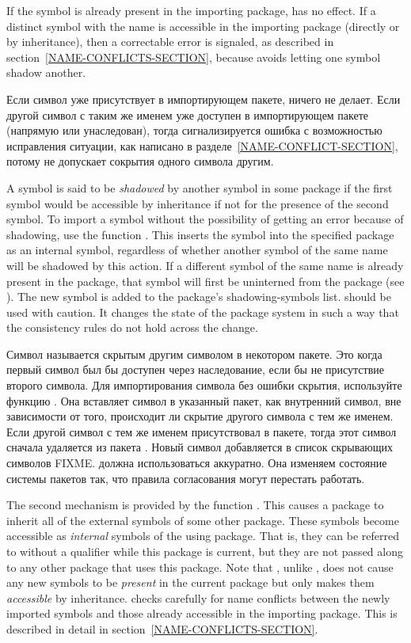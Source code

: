 If the symbol is already present in the importing package, 
has no effect.  If a distinct symbol with the name  is
accessible in the importing package (directly or by inheritance), then a
correctable error is signaled, as described in
section~\ref{NAME-CONFLICTS-SECTION}, because  avoids letting
one symbol shadow another.

Если символ уже присутствует в импортирующем пакете,  ничего не
делает. Если другой символ с таким же именем  уже доступен в
импортирующем пакете (напрямую или унаследован), тогда сигнализируется ошибка с
возможностью исправления ситуации, как написано в
разделе~\ref{NAME-CONFLICT-SECTION}, потому  не допускает сокрытия
одного символа другим.

A symbol is said to be \emph{shadowed} by another symbol in
some package if the first symbol would be accessible by inheritance
if not for the presence of the second symbol.
To import a symbol without the possibility
of getting an
error because of shadowing,
use the function .  This inserts
the symbol into the specified package as an internal symbol, regardless
of whether another symbol of the same name will be shadowed by this
action.
If a different symbol of the same name is already present
in the package, that symbol will first be uninterned from the package
(see ).  The new symbol is
added to the package's shadowing-symbols list.  
should be used with caution.  It changes the state of the package system
in such a way that the consistency rules do not hold across the change.

Символ называется скрытым другим символом в некотором пакете. Это когда первый
символ был бы доступен через наследование, если бы не присутствие второго
символа.
Для импортирования символа без ошибки скрытия, используйте функцию
. Она вставляет символ в указанный пакет, как внутренний
символ, вне зависимости от того, происходит ли скрытие другого символа с тем же
именем.
Если другой символ с тем же именем присутствовал в пакете, тогда этот символ
сначала удаляется из пакета . Новый символ добавляется в список
скрывающих символов FIXME.  должна использоваться
аккуратно. Она изменяем состояние системы пакетов так, что правила согласования
могут перестать работать.

The second mechanism is provided by the function .  This
causes a package to inherit all of the external symbols of some other
package.  These symbols become accessible as \emph{internal} symbols of the
using package.  That is, they can be referred to without a qualifier
while this package is current, but they are not passed along to any
other package that uses this package.  Note that ,
unlike , does not cause any new symbols to be \emph{present}
in the current package but only makes them \emph{accessible} by inheritance.
 checks carefully for
name conflicts between the newly imported symbols and those already
accessible in the importing package.  This is described in detail in
section~\ref{NAME-CONFLICTS-SECTION}.

